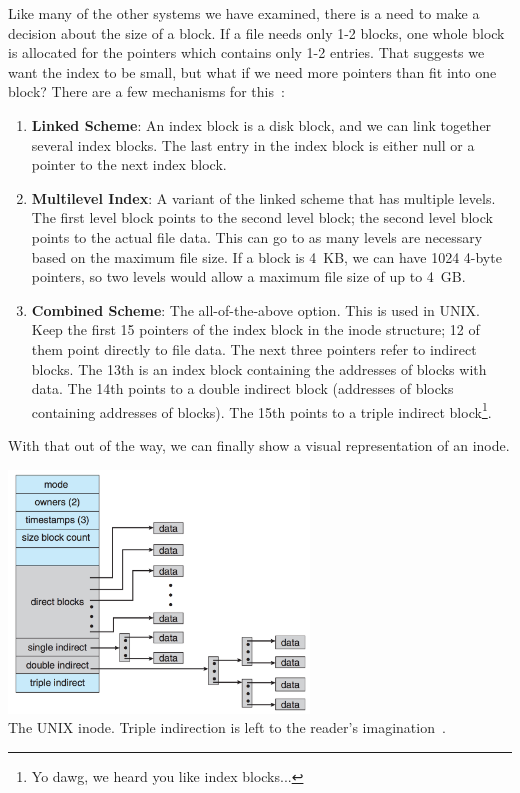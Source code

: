 Like many of the other systems we have examined, there is a need to make a decision about the size of a block. If a file needs only 1-2 blocks, one whole block is allocated for the pointers which contains only 1-2 entries. That suggests we want the index to be small, but what if we need more pointers than fit into one block? There are a few mechanisms for this~\cite{osc}:

\begin{enumerate}
	\item \textbf{Linked Scheme}: An index block is a disk block, and we can link together several index blocks. The last entry in the index block is either null or a pointer to the next index block.
	\item \textbf{Multilevel Index}: A variant of the linked scheme that has multiple levels. The first level block points to the second level block; the second level block points to the actual file data. This can go to as many levels are necessary based on the maximum file size. If a block is 4~KB, we can have 1024 4-byte pointers, so two levels would allow a maximum file size of up to 4~GB.
	\item \textbf{Combined Scheme}: The all-of-the-above option. This is used in UNIX. Keep the first 15 pointers of the index block in the inode structure; 12 of them point directly to file data. The next three pointers refer to indirect blocks. The 13th is an index block containing the addresses of blocks with data. The 14th points to a double indirect block (addresses of blocks containing addresses of blocks). The 15th points to a triple indirect block\footnote{Yo dawg, we heard you like index blocks...}.
\end{enumerate}

With that out of the way, we can finally show a visual representation of an inode.

\begin{center}
	\includegraphics[width=0.6\textwidth]{images/unix-inode.png}\\
	The UNIX inode. Triple indirection is left to the reader's imagination~\cite{osc}.
\end{center}



